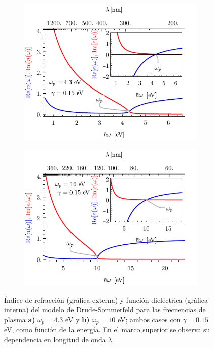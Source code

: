 \documentclass[letterpaper,11pt] {article}
\begin{document}
	\begin{figure}[t!]\centering
	\begin{subfigure}{.01\linewidth}\caption{}\label{sfig:Drude4eV}\vspace{3.75cm}\end{subfigure}\hspace*{-1em}
	\begin{subfigure}{.45\linewidth}\centering \includegraphics[scale=1. ]{0-varepsn4eV.pdf}\end{subfigure}
	\begin{subfigure}{.01\linewidth}\caption{}\label{sfig:Drude10eV}\vspace{3.75cm}\end{subfigure}\hspace*{-1em}
	\begin{subfigure}{.45\linewidth}\centering \includegraphics[scale=1. ]{0-varepsn10eV.pdf}\end{subfigure}
	\caption{ Índice de refracción (gráfica externa) y función dieléctrica (gráfica interna) del modelo de Drude-Sommerfeld para las frecuencias de plasma \textbf{a)} $\omega_p=4. 3$ eV y \textbf{b)} $\omega_p=10$ eV; ambos casos con $\gamma=0. 15$ eV, como función de la energía.  En el marco superior se observa su dependencia en longitud de onda $\lambda$. }\label{fig:Drude}
	\end{figure}	
\end{document}
